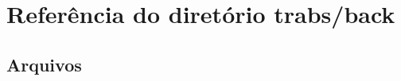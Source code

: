 \section{Referência do diretório trabs/back}
\label{dir_6c9442243324c3e3115acb9ac303111e}
\subsection*{Arquivos}
\begin{DoxyCompactItemize}
\end{DoxyCompactItemize}
